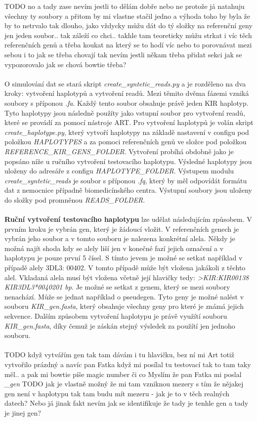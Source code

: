 \documentclass[czech,DP]{thesiskiv}
\numberwithin{equation}{section}
\begin{document}
TODO no a tady zase nevím jestli to dělám dobře nebo ne protože já natahuju všechny ty soubory a přitom by mi vlastne stačil jedno a výhoda toho by byla že by to netrvalo tak dlouho, jako vždycky můžu dát do tý složky na referenční geny jen jeden soubor.. tak záleží co chci.. takhle tam teoreticky můžu strkat i víc těch referenčních genů a třeba koukat na který se to hodí víc nebo to porovnávat mezi sebou
i to jak se třeba chovají
tak nevím jestli někam třeba přidat sekci jak se vypozorovalo jak se chová bowtie třeba?
\\
\\
O simulování dat se stará skript \textit{create\_syntetic\_reads.py} a je rozděleno na dva kroky: vytvoření haplotypů a vytvoření readů. Mezi těmito dvěma fázemi vzniká soubory s příponou \textit{.fa}. Každý tento soubor obsahuje právě jeden KIR haplotyp. Tyto haplotypy jsou následně použíty jako vstupní soubor pro vytvoření readů, které se provádí za pomocí nástroje ART. Pro vytvoření haplotypů je volán skript \textit{create\_haplotype.py}, který vytvoří haplotypy na základě nastavení v configu pod položkou \textit{HAPLOTYPES} a za pomoci referenčních genů ve složce pod položkou \textit{REFERENCE\_KIR\_GENS\_FOLDER}. Vytvoření probíhá obdobně jako je popsáno níže u ručního vytvoření testovacího haplotypu. Výsledné haplotypy jsou uloženy do adresáře z configu \textit{HAPLOTYPE\_FOLDER}. Výstupem modulu \textit{create\_syntetic\_reads} je soubor s příponou \textit{.fq}, který by měl odpovídát formátu dat z nemocnice případně biomedicínského centra. Výstupní soubory jsou uloženy do složky pod promněnou \textit{READS\_FOLDER}.
\\
\\
\textbf{Ruční vytvoření testovacího haplotypu} lze udělat následujícím způsobem. V prvním kroku je vybrán gen, který je žádoucí vložit. V referenčních genech je vybrán jeho soubor a v tomto souboru je nalezena konkrétní alela. Někdy je možná najít shoda kdy se alely liší jen v konečné fazí jejich označení a v haplotypu je pouze první 5 čísel. S tímto jevem je možné se setkat například v případě alely 3DL3: 00402. V tomto případě může být vložena jakákoli z těchto alel. Vkladaná alela musí být vložena včetně její hlavičky tedy: \textit{>KIR:KIR00138 \: KIR3DL3*0040201  \: bp}. Je možné se setkat z genem, který se mezi soubory nenachází. Může se jednat například o pseudegen. Tyto geny je možné nalést v souboru \textit{KIR\_gen.fasta}, který obsahuje všechny geny pro které je známá jejich sekvence. Dalším způsobem vytvoření haplotypu je právě využítí souboru \textit{KIR\_gen.fasta}, díky čemuž je záskán stejný výsledek za použítí jen jednoho souboru. 
\\
\\
TODO když vytvářím gen tak tam dávám i tu hlavičku, bez ní mi Art totiž vytvořilo prázdný a navíc pan Fatka když mi posílal tu testovací tak to tam taky měl.. a pak mi bowtie píše magic number či co 
Myslím že pan Fatka mi poslal \textit{\_gen}
TODO jak je vlastně možný že mi tam vzniknou mezery s tím že nějakej gen není v haplotypu tak tam budu mít mezeru - jak je to v těch realných datech?
Nebo já jinak fakt nevím jak se identifikuje že tady je tenhle gen a tady je jinej gen?  
\end{document}
